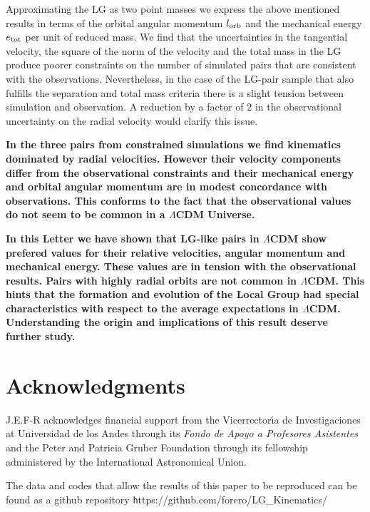 \documentclass{emulateapj}
\begin{document}
Approximating the LG as two point masses we express the above mentioned results in terms of the orbital angular momentum $l_{\rm orb}$ and the mechanical energy $e_{\rm tot}$ per unit of reduced mass. We find that the uncertainties in the tangential velocity, the square of the norm of the velocity and the total mass in the LG produce poorer constraints on the number of simulated pairs that are consistent with the observations. Nevertheless, in the case of the LG-pair sample that also fulfills the separation and total mass criteria there is a slight tension between simulation and observation. A reduction by a factor of $2$ in the observational uncertainty on the radial velocity would clarify this issue.

{\bf In the three pairs from constrained simulations we find kinematics dominated by radial velocities. However their velocity components differ from the observational constraints and their mechanical energy and orbital angular momentum are in modest concordance with observations. This conforms to the fact that the observational values do not seem to be common in a $\Lambda$CDM Universe.}

{\bf In this Letter we have shown that LG-like pairs in $\Lambda$CDM show prefered values for their relative velocities, angular momentum and mechanical energy. These values are in tension with the observational results. Pairs with highly radial orbits are not common in $\Lambda$CDM. This hints that the formation and evolution of the Local Group had special characteristics with respect to the average expectations in $\Lambda$CDM. Understanding the origin and implications of this result deserve further study.}



\label{sec:conclusions}
\section*{Acknowledgments}  
J.E.F-R acknowledges financial support from the Vicerrector\'{\i}a de Investigaciones at Universidad de los Andes through its {\it Fondo de Apoyo a Profesores Asistentes} and the Peter and Patricia Gruber Foundation through its fellowship administered by the International Astronomical Union.


The data and codes that allow the results of this paper to be reproduced can be found as a github repository {\texttt https://github.com/forero/LG\_Kinematics/}


 
\end{document}
